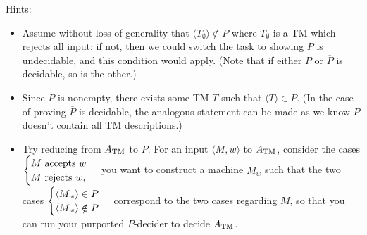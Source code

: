 \documentclass[11pt]{article}
\begin{document}
\begin{enumerate}
Hints:
\begin{itemize}
\item Assume without loss of generality that $\langle T_\emptyset \rangle \notin P$ where $T_\emptyset$ is a TM which rejects all input: if not, then we could switch the task to showing $\overline{P}$ is undecidable, and this condition would apply. (Note that if either $P$ or $\overline{P}$ is decidable, so is the other.)
\item Since $P$ is nonempty, there exists some TM $T$ such that $\langle T \rangle \in P$. (In the case of proving $\overline{P}$ is decidable, the analogous statement can be made as we know $P$ doesn't contain all TM descriptions.)
\item Try reducing from $A_\textnormal{TM}$ to $P$. For an input $\langle M, w \rangle$ to $A_\textnormal{TM}$, consider the cases $\begin{cases} M \textnormal { accepts } w \cr M \textnormal { rejects } w, \end{cases}$ you want to construct a machine $M_w$ such that the two cases $\begin{cases} \langle M_w \rangle \in P \cr \langle M_w \rangle \notin P \end{cases}$ correspond to the two cases regarding $M$, so that you can run your purported $P$-decider to decide $A_\textnormal{TM}$. 
\end{itemize}
\end{enumerate}
\end{document}
